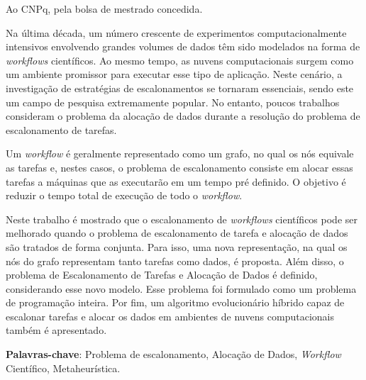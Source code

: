 Ao CNPq, pela bolsa de mestrado concedida.
\begin{resumo}


Na última década, um número crescente de experimentos computacionalmente intensivos envolvendo grandes volumes de dados têm sido modelados na forma de \textit{workflows} científicos. Ao mesmo tempo, as nuvens computacionais surgem como um ambiente promissor para executar esse tipo de aplicação. Neste cenário, a investigação de estratégias de escalonamentos se tornaram essenciais, sendo este um campo de pesquisa extremamente popular. No entanto, poucos trabalhos consideram o problema da alocação de dados durante a resolução do problema de escalonamento de tarefas. 

Um \textit{workflow} é geralmente representado como um grafo, no qual os nós equivale as tarefas e, nestes casos, o problema de escalonamento consiste em alocar essas tarefas a máquinas que as executarão em um tempo pré definido.  O objetivo é reduzir o tempo total de execução de todo o \textit{workflow}.

Neste trabalho é mostrado que o escalonamento de \textit{workflows} científicos pode ser melhorado quando o problema de escalonamento de tarefa e alocação de dados são tratados de forma conjunta. Para isso, uma nova representação, na qual os nós do grafo representam tanto tarefas como dados, é proposta. Além disso, o problema de Escalonamento de Tarefas e Alocação de Dados é definido, considerando esse novo modelo. Esse problema foi formulado como um problema de programação inteira. Por fim, um algoritmo evolucionário híbrido capaz de escalonar tarefas e alocar os dados em ambientes de nuvens computacionais também é apresentado.


{\hspace{-8mm} \bf{Palavras-chave}}: Problema de escalonamento, Alocação de Dados, \textit{Workflow} Científico, Metaheurística.

\end{resumo}

